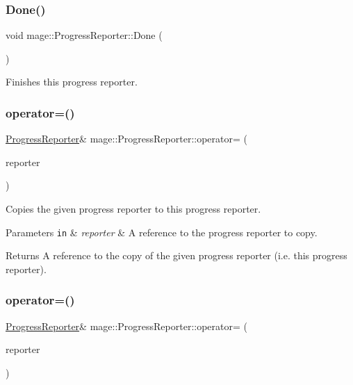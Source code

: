 \subsubsection{\texorpdfstring{Done()}{Done()}}
{\footnotesize\ttfamily void mage\+::\+Progress\+Reporter\+::\+Done (\begin{DoxyParamCaption}{ }\end{DoxyParamCaption})}

Finishes this progress reporter. \mbox{\label{classmage_1_1_progress_reporter_aa98411a059ad0e77ca53d064176f3a86}} 
\subsubsection{\texorpdfstring{operator=()}{operator=()}\hspace{0.1cm}{\footnotesize\ttfamily [1/2]}}
{\footnotesize\ttfamily \mbox{\hyperlink{classmage_1_1_progress_reporter}{Progress\+Reporter}}\& mage\+::\+Progress\+Reporter\+::operator= (\begin{DoxyParamCaption}\item[{const \mbox{\hyperlink{classmage_1_1_progress_reporter}{Progress\+Reporter}} \&}]{reporter }\end{DoxyParamCaption})\hspace{0.3cm}{\ttfamily [delete]}}

Copies the given progress reporter to this progress reporter.


\begin{DoxyParams}[1]{Parameters}
\mbox{\tt in}  & {\em reporter} & A reference to the progress reporter to copy. \\
\hline
\end{DoxyParams}
\begin{DoxyReturn}{Returns}
A reference to the copy of the given progress reporter (i.\+e. this progress reporter). 
\end{DoxyReturn}
\mbox{\label{classmage_1_1_progress_reporter_adfc77427eaff8caf71c1995bf986edc5}} 
\subsubsection{\texorpdfstring{operator=()}{operator=()}\hspace{0.1cm}{\footnotesize\ttfamily [2/2]}}
{\footnotesize\ttfamily \mbox{\hyperlink{classmage_1_1_progress_reporter}{Progress\+Reporter}}\& mage\+::\+Progress\+Reporter\+::operator= (\begin{DoxyParamCaption}\item[{\mbox{\hyperlink{classmage_1_1_progress_reporter}{Progress\+Reporter}} \&\&}]{reporter }\end{DoxyParamCaption})\hspace{0.3cm}{\ttfamily [delete]}}

